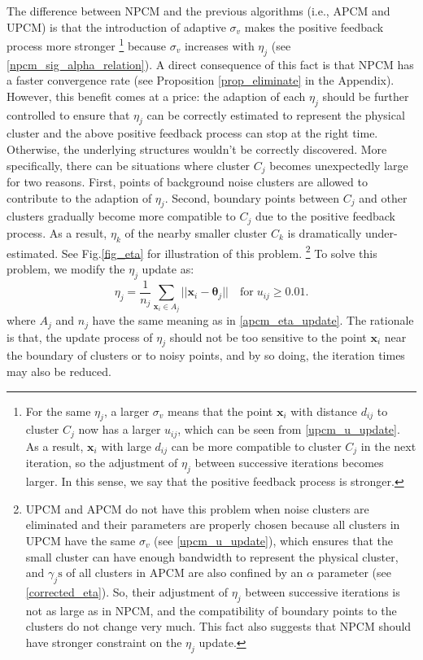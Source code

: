 \documentclass[conference]{IEEEtran}
\theoremstyle{definition}
\begin{document}
The difference between NPCM and the previous algorithms (i.e., APCM and UPCM) is that the introduction of adaptive $\sigma_v$ makes the positive feedback process more stronger 
\footnote{For the same $\eta_j$, a larger $\sigma_v$ means that the point $\mathbf{x}_i$ with distance $d_{ij}$ to cluster $C_j$ now has a larger $u_{ij}$, which can be seen from \eqref{upcm_u_update}. As a result, $\mathbf{x}_i$ with large $d_{ij}$ can be more compatible to cluster $C_j$ in the next iteration, so the adjustment of $\eta_j$ between successive iterations becomes larger. In this sense, we say that the positive feedback process is stronger.} 
because $\sigma_v$ increases with $\eta_j$ (see \eqref{npcm_sig_alpha_relation}). A direct consequence of this fact is that NPCM has a faster convergence rate (see Proposition \ref{prop_eliminate} in the Appendix).
However, this benefit comes at a price: the adaption of each $\eta_j$ should be further controlled to ensure that $\eta_j$ can be correctly estimated to represent the physical cluster and the above positive feedback process can stop at the right time. Otherwise, the underlying structures wouldn't be correctly discovered.
More specifically, there can be situations where cluster $C_j$ becomes unexpectedly large for two reasons. First, points of background noise clusters are allowed to contribute to the adaption of $\eta_j$. Second, boundary points between $C_j$ and other clusters gradually become more compatible to $C_j$ due to the positive feedback process. As a result, $\eta_k$ of the nearby smaller cluster $C_k$ is dramatically under-estimated. See Fig.\ref{fig_eta} for illustration of this problem.
\footnote{UPCM and APCM do not have this problem when noise clusters are eliminated and their parameters are properly chosen because all clusters in UPCM have the same $\sigma_v$ (see \eqref{upcm_u_update}), which ensures that the small cluster can have enough bandwidth to represent the physical cluster, and $\gamma_j\text{s}$ of all clusters in APCM are also confined by an $\alpha$ parameter (see \eqref{corrected_eta}). So, their adjustment of $\eta_j$ between successive iterations is not as large as in NPCM, and the compatibility of boundary points to the clusters do not change very much. This fact also suggests that NPCM should have stronger constraint on the $\eta_j$ update.} 
To solve this problem, we modify the $\eta_j$ update as:
\begin{equation}
\label{npcm_eta_update}
\eta_j=\frac{1}{n_j}\sum_{\mathbf{x}_i\in A_j}||\mathbf{x}_i-\boldsymbol{\theta}_j|| \quad \text{for}\;u_{ij} \geq 0.01.
\end{equation}
where $A_j$ and $n_j$ have the same meaning as in \eqref{apcm_eta_update}. The rationale is that, the update process of $\eta_j$ should not be too sensitive to the point $\mathbf{x}_i$ near the boundary of clusters or to noisy points, and by so doing, the iteration times may also be reduced.
\end{document}
